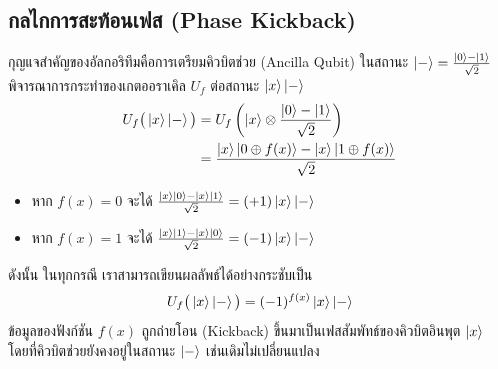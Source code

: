\subsection{กลไกการสะท้อนเฟส (Phase Kickback)}
กุญแจสำคัญของอัลกอริทึมคือการเตรียมคิวบิตช่วย (Ancilla Qubit) ในสถานะ $\ket{-} = \frac{\ket{0}-\ket{1}}{\sqrt{2}}$ พิจารณาการกระทำของเกตออราเคิล $U_f$ ต่อสถานะ $\ket{x}\ket{-}$
\begin{align}
U_f \big( \ket{x}\ket{-} \big) &= U_f \left( \ket{x} \otimes \frac{\ket{0}-\ket{1}}{\sqrt{2}} \right) \nonumber \\
&= \frac{\ket{x}\ket{0 \oplus f(x)} - \ket{x}\ket{1 \oplus f(x)}}{\sqrt{2}}
\end{align}
\begin{itemize}
    \item หาก $f(x) = 0$ จะได้ $\frac{\ket{x}\ket{0} - \ket{x}\ket{1}}{\sqrt{2}} = (+1) \ket{x}\ket{-}$
    \item หาก $f(x) = 1$ จะได้ $\frac{\ket{x}\ket{1} - \ket{x}\ket{0}}{\sqrt{2}} = (-1) \ket{x}\ket{-}$
\end{itemize}
ดังนั้น ในทุกกรณี เราสามารถเขียนผลลัพธ์ได้อย่างกระชับเป็น
\begin{equation}
U_f \big( \ket{x}\ket{-} \big) = (-1)^{f(x)} \ket{x}\ket{-}
\label{eq:phase_kickback_identity}
\end{equation}
ข้อมูลของฟังก์ชัน $f(x)$ ถูกถ่ายโอน (Kickback) ขึ้นมาเป็นเฟสสัมพัทธ์ของคิวบิตอินพุต $\ket{x}$ โดยที่คิวบิตช่วยยังคงอยู่ในสถานะ $\ket{-}$ เช่นเดิมไม่เปลี่ยนแปลง

